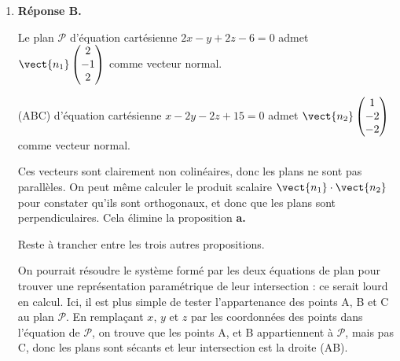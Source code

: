\begin{enumerate}
Ce système n'a pas de solution, donc les droites n'ont aucun point commun et ne sont pas parallèles : elles sont donc non coplanaires.

\item \textbf{Réponse B.}

Le plan $\mathcal{P}$ d'équation cartésienne $2 x-y+2 z-6=0$ admet $\vect{n_1} \begin{pmatrix}	2\\-1\\2\end{pmatrix}$ comme vecteur normal.

(ABC) d'équation cartésienne $x-2 y-2 z+15=0$ admet $\vect{n_2} \begin{pmatrix}1\\-2\\-2\end{pmatrix}$ comme vecteur normal.

Ces vecteurs sont clairement non colinéaires, donc les plans ne sont pas parallèles. On peut même calculer le produit scalaire $\vect{n_1}\cdot\vect{n_2}$ pour constater qu'ils sont orthogonaux, et donc que les plans sont perpendiculaires. Cela élimine la proposition \textbf{a.}

Reste à trancher entre les trois autres propositions.

On pourrait résoudre le système formé par les deux équations de plan pour trouver une représentation paramétrique de leur intersection : ce serait lourd en calcul. Ici, il est plus simple de tester l'appartenance des points A, B et C au plan $\mathcal{P}$. En remplaçant $x$, $y$ et $z$ par les coordonnées des points dans l'équation de $\mathcal{P}$, on trouve que les points A, et B appartiennent à $\mathcal{P}$, mais pas C, donc les plans sont sécants et leur intersection est la droite (AB).
	\end{enumerate}

\bigskip
